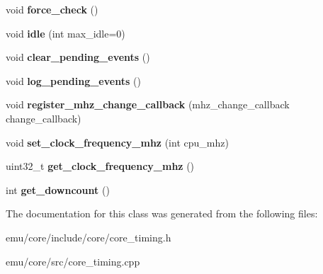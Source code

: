 \begin{DoxyCompactItemize}
void {\bfseries force\+\_\+check} ()
\item 
\mbox{\label{classeka2l1_1_1timing__system_a0428ae10a5d164019f30e5fced0e8976}} 
void {\bfseries idle} (int max\+\_\+idle=0)
\item 
\mbox{\label{classeka2l1_1_1timing__system_acce103d0cde8ae00a8e81d86ec8b2295}} 
void {\bfseries clear\+\_\+pending\+\_\+events} ()
\item 
\mbox{\label{classeka2l1_1_1timing__system_a2ab7fcc61b1cdfba947bd64da980f73e}} 
void {\bfseries log\+\_\+pending\+\_\+events} ()
\item 
\mbox{\label{classeka2l1_1_1timing__system_a23fa4bf45c95edf38d2b323b4903af30}} 
void {\bfseries register\+\_\+mhz\+\_\+change\+\_\+callback} (mhz\+\_\+change\+\_\+callback change\+\_\+callback)
\item 
\mbox{\label{classeka2l1_1_1timing__system_a6e63411fc437f9ba71fe63ec7b338c6a}} 
void {\bfseries set\+\_\+clock\+\_\+frequency\+\_\+mhz} (int cpu\+\_\+mhz)
\item 
\mbox{\label{classeka2l1_1_1timing__system_a06bb2154cd8f1889fd97987ef558dbe0}} 
uint32\+\_\+t {\bfseries get\+\_\+clock\+\_\+frequency\+\_\+mhz} ()
\item 
\mbox{\label{classeka2l1_1_1timing__system_a62da53e7e38db5f92733c63da62c2e2c}} 
int {\bfseries get\+\_\+downcount} ()
\end{DoxyCompactItemize}


The documentation for this class was generated from the following files\+:\begin{DoxyCompactItemize}
\item 
emu/core/include/core/core\+\_\+timing.\+h\item 
emu/core/src/core\+\_\+timing.\+cpp\end{DoxyCompactItemize}
